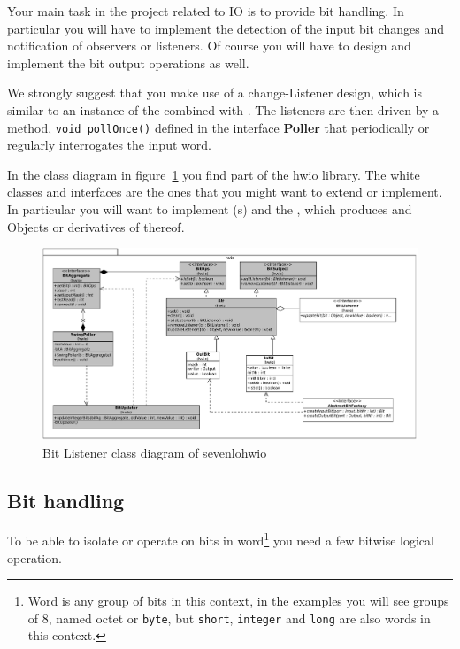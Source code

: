 Your main task in the project related to IO is to provide bit handling.
In particular you will have to implement the detection of the
input bit changes and notification of observers or listeners.
Of course you will have to design and implement the bit output
operations as well. 

We strongly suggest that you make use of a change-Listener design,
which is similar to an instance of the 
combined with . The listeners are then driven by a
method, \lstinline{void pollOnce()} defined in the interface 
\textbf{Poller} that periodically or regularly interrogates the 
input word.

In the class diagram in figure~\ref{fig:listener} you find part of the
hwio library. The white classes and interfaces are the ones that you
might want to extend or implement. In particular you will want to
implement (s) and the ,
which produces  and  Objects or derivatives
of thereof.
\begin{figure}[htbp]
  \centering
  \includegraphics[width=\textwidth]{figures/hwio.pdf}
  \caption{Bit Listener class diagram of sevenlohwio}
  \label{fig:listener}
\end{figure}

\subsection{Bit handling}

To be able to isolate or operate on bits in word\footnote{Word is any
  group of bits in this context, in the examples you will see groups
  of 8, named octet or \lstinline{byte}, but \lstinline{short}, \lstinline{integer} and \lstinline{long} are also words
  in this context.} you need a few bitwise logical operation.

